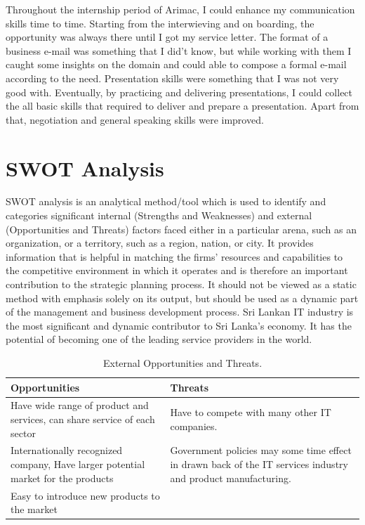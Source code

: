 \documentclass[twoside,12pt,times,onecolumn,a4paper]{report}
\begin{document}
Throughout the internship period of Arimac, I could enhance my communication skills time to time. Starting from the interwieving and on boarding, the opportunity was always there until I got my service letter. The format of a business e-mail was something that I did't know, but while working with them I caught some insights on the domain and could able to compose a formal e-mail according to the need. Presentation skills were something that I was not very good with. Eventually, by practicing and delivering presentations, I could collect the all basic skills that required to deliver and prepare a presentation. Apart from that, negotiation and general speaking skills were improved. 

\chapter{ SWOT Analysis }
\hspace{3em}SWOT analysis is an analytical method/tool which is used to identify and categories significant internal (Strengths and Weaknesses) and external (Opportunities and Threats) factors faced either in a particular arena, such as an organization, or a territory, such as a region, nation, or city.
It provides information that is helpful in matching the firms’ resources and capabilities to the competitive environment in which it operates and is therefore an important contribution to the strategic planning process. It should not be viewed as a static method with emphasis solely on its output, but should be used as a dynamic part of the management and business development process. Sri Lankan IT industry is the most significant and dynamic contributor to Sri Lanka’s economy. It has the potential of becoming one of the leading service providers in the world. 


\begin{table}[!h]
\centering


 \begin{tabular}{||p{}|p{}||}
 \hline
 Opportunities & Threats\\ [0.5ex] 
 \hline\hline
 Have wide range of product and services, can share service of each sector & Have to compete with many other IT companies. \\ 
 \hline
Internationally recognized company, Have larger potential market for the products& Government policies may some time effect in drawn back of the IT services industry and product manufacturing.  \\
 \hline
Easy to introduce new products to the market  &   \\ [1ex]
\hline
 \end{tabular}
\caption{External Opportunities and Threats.}
\label{tab:table1}
\end{table}
\end{document}
